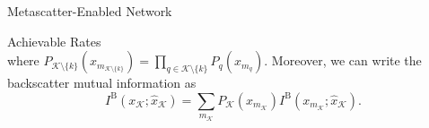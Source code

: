 \documentclass[journal]{IEEEtran}
\begin{document}
\begin{section}{Metascatter-Enabled Network}
\begin{subsection}{Achievable Rates}
\begin{equation}
			\label{eq:backscatter_marginal_information}
		\end{equation}
		where $P_{\mathcal{K} \setminus \{k\}}(x_{m_{\mathcal{K} \setminus \{k\}}}) = \prod_{q \in \mathcal{K} \setminus \{k\}} P_{q}(x_{m_{q}})$.
		Moreover, we can write the backscatter mutual information as
		\begin{equation}
			I^{\mathrm{B}}(x_{\mathcal{K}};\hat{x}_{\mathcal{K}}) = \sum_{m_{\mathcal{K}}} P_{\mathcal{K}}(x_{m_{\mathcal{K}}}) I^{\mathrm{B}}(x_{m_{\mathcal{K}}};\hat{x}_{\mathcal{K}}).
			\label{eq:backscatter_mutual_information}
		\end{equation}



\end{subsection}
\end{section}
\end{document}
